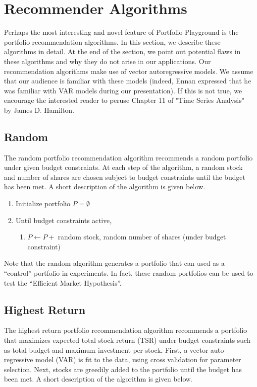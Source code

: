 \documentclass{article}
\begin{document}
\section{Recommender Algorithms} \label{sec:alg}
Perhaps the most interesting and novel feature of Portfolio Playground is the portfolio recommendation algorithms. In this section, we describe these algorithms in detail. At the end of the section, we point out potential flaws in these algorithms and why they do not arise in our applications. Our recommendation algorithms make use of vector autoregressive models. We assume that our audience is familiar with these models (indeed, Ennan expressed that he was familiar with VAR models during our presentation). If this is not true, we encourage the interested reader to peruse Chapter 11 of "Time Series Analysis" by James D. Hamilton.

\subsection{Random}
The random portfolio recommendation algorithm recommends a random portfolio under given budget constraints. At each step of the algorithm, a random stock and number of shares are chosen subject to budget constraints until the budget has been met. A short description of the algorithm is given below.

\begin{enumerate}
	\item Initialize portfolio $P = \emptyset$
	\item Until budget constraints active,
		\begin{enumerate}
			\item $P \leftarrow P +$ random stock, random number of shares (under budget constraint)
		\end{enumerate}
\end{enumerate}

Note that the random algorithm generates a portfolio that can used as a ``control'' portfolio in experiments. In fact, these random portfolios can be used to test the ``Efficient Market Hypothesis''.

\subsection{Highest Return}
The highest return portfolio recommendation algorithm recommends a portfolio that maximizes expected total stock return (TSR) under budget constraints such as total budget and maximum investment per stock. First, a vector auto-regressive model (VAR) is fit to the data, using cross validation for parameter selection. Next, stocks are greedily added to the portfolio until the budget has been met. A short description of the algorithm is given below.
\end{document}
